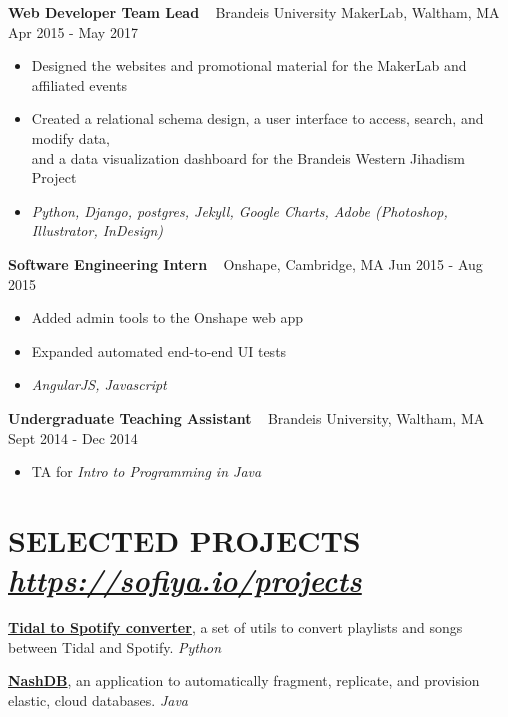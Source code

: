\documentclass{res}
\begin{document}
\begin{resume}
\textbf{Web Developer Team Lead} ~ Brandeis University MakerLab, Waltham, MA  \hfill Apr 2015 - May 2017 \\
	\begin{itemize}  \itemsep -2pt %
	\item Designed the websites and promotional material for the MakerLab and affiliated events
	\item Created a relational schema design, a user interface to access, search, and modify data,  \\
	and a data visualization dashboard for the Brandeis Western Jihadism Project
	\item {\sl Python, Django, postgres, Jekyll, Google Charts, Adobe (Photoshop, \\ 
		Illustrator, InDesign)}
	\end{itemize}
		
\textbf{Software Engineering Intern} ~ Onshape, Cambridge, MA \hfill Jun 2015 - Aug 2015 \\ 
	\begin{itemize}  \itemsep -2pt %
	\item Added admin tools to the Onshape web app
	\item Expanded automated end-to-end UI tests
	\item {\sl AngularJS, Javascript}
	\end{itemize}
	
\textbf{Undergraduate Teaching Assistant} ~ Brandeis University, Waltham, MA \hfill Sept 2014 - Dec 2014 \\ 
	\begin{itemize}  \itemsep -2pt %
	\item TA for {\sl Intro to Programming in Java}
	\end{itemize}


\section{SELECTED PROJECTS ~  {\sl \href{https://sofiya.io/projects}{https://sofiya.io/projects}}}

\textbf{\href{https://sofiya.io/projects/tidal-8596-spotify-converter.html}{Tidal to Spotify converter}}, a set of utils to convert playlists and songs between Tidal and Spotify.  {\sl Python} 

\textbf{\href{https://api.zotero.org/users/3604318/publications/items/35KTECTC/file/view}{NashDB}}, an application to automatically fragment, replicate, and provision elastic, cloud databases. {\sl Java }


\end{resume}
\end{document}

